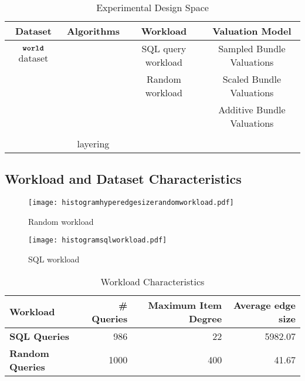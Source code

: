 \begin{table*} \centering
	\def\arraystretch{1.35}%
	\begin{tabular}{c|c|c|c}
		\toprule
		\textbf{Dataset} & \textbf{Algorithms} & \textbf{Workload} & \textbf{Valuation Model}\\ \midrule
		$\texttt{\bfseries world}$ dataset & \ubp & SQL query workload & Sampled Bundle Valuations \\ 
		& \uip & Random workload & Scaled Bundle Valuations \\ 
		& \lpip &  & Additive Bundle Valuations \\ 
		& \cip & &  \\
		& layering &  &  \\
		\bottomrule
	\end{tabular}
	\caption{Experimental Design Space}
	\label{table:experiments}
\end{table*}

\subsection{Workload and Dataset Characteristics}

\begin{figure}[!h]
	
	\begin{minipage}[t]{0.49\linewidth}
		\centering
		\texttt{[image: histogramhyperedgesizerandomworkload.pdf]}
		\caption{Random workload} \label{fig:histogramrandom}
	\end{minipage}
	\begin{minipage}[t]{0.47\linewidth} 
		\centering
		\texttt{[image: histogramsqlworkload.pdf]}
		\caption{SQL workload} \label{fig:histogramrealqueries}
	\end{minipage}        
\end{figure}  

\begin{table*}[] \centering
	\begin{small}
		\begin{tabular}{@{}lrrr@{}}\toprule
			\textbf{Workload} & \textbf{\# Queries} & \textbf{Maximum Item Degree} & \textbf{Average edge size} \\ \midrule
			
			\textbf{SQL Queries} &  986 & 22 & 5982.07  \\ \hdashline
			\textbf{Random Queries} &  1000 & 400 &  41.67  \\
			\bottomrule
		\end{tabular}
	\end{small}
	\caption{Workload Characteristics}
	\label{table:workload:characteristics}
\end{table*}

